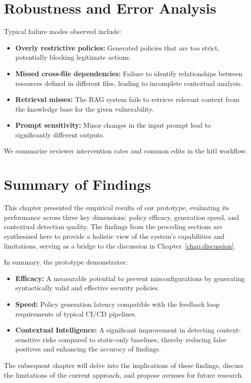 \section{Robustness and Error Analysis}\label{sec:robustness-error}

Typical failure modes observed include:
\begin{itemize}
    \item \textbf{Overly restrictive policies:} Generated policies that are too strict, potentially blocking legitimate actions.
    \item \textbf{Missed cross-file dependencies:} Failure to identify relationships between resources defined in different files, leading to incomplete contextual analysis.
    \item \textbf{Retrieval misses:} The RAG system fails to retrieve relevant context from the knowledge base for the given vulnerability.
    \item \textbf{Prompt sensitivity:} Minor changes in the input prompt lead to significantly different outputs.
\end{itemize}
We summarize reviewer intervention rates and common edits in the \gls{hitl} workflow.

\section{Summary of Findings}\label{sec:summary-findings}

This chapter presented the empirical results of our prototype, evaluating its performance across three key dimensions: policy efficacy, generation speed, and contextual detection quality. The findings from the preceding sections are synthesized here to provide a holistic view of the system's capabilities and limitations, serving as a bridge to the discussion in Chapter~\ref{chap:discussion}.

In summary, the prototype demonstrates:
\begin{itemize}
    \item \textbf{Efficacy:} A measurable potential to prevent misconfigurations by generating syntactically valid and effective security policies.
    \item \textbf{Speed:} Policy generation latency compatible with the feedback loop requirements of typical CI/CD pipelines.
    \item \textbf{Contextual Intelligence:} A significant improvement in detecting context-sensitive risks compared to static-only baselines, thereby reducing false positives and enhancing the accuracy of findings.
\end{itemize}

The subsequent chapter will delve into the implications of these findings, discuss the limitations of the current approach, and propose avenues for future research.